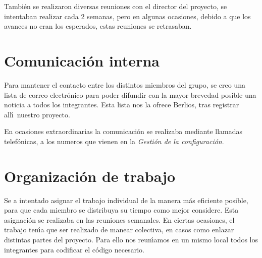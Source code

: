 \documentclass[a4paper,11pt]{article}
\begin{document}
Tambi\'en se realizaron diversas reuniones con el director del proyecto, se intentaban realizar cada 2 semanas, pero en algunas ocasiones, debido a que los avances no eran los esperados, estas reuniones se retrasaban.

\section{Comunicaci\'on interna}

Para mantener el contacto entre los distintos miembros del grupo, se creo una lista de correo electr\'onico para poder difundir con la mayor brevedad posible una noticia a todos los integrantes. Esta lista nos la ofrece Berlios, tras registrar all\'\i ~nuestro proyecto.

En ocasiones extraordinarias la comunicaci\'on se realizaba mediante llamadas telef\'onicas, a los numeros que vienen en la \emph{Gesti\'on de la configuraci\'on}.

\section{Organizaci\'on de trabajo}

Se a intentado asignar el trabajo individual de la manera m\'as eficiente posible, para que cada miembro se distribuya su tiempo como mejor considere. Esta asignaci\'on se realizaba en las reuniones semanales.
En ciertas ocasiones, el trabajo ten\'\i a que ser realizado de manear colectiva, en casos como enlazar distintas partes del proyecto. Para ello nos reun\'\i amos en un mismo local todos los integrantes para codificar el c\'odigo necesario.
\end{document}
